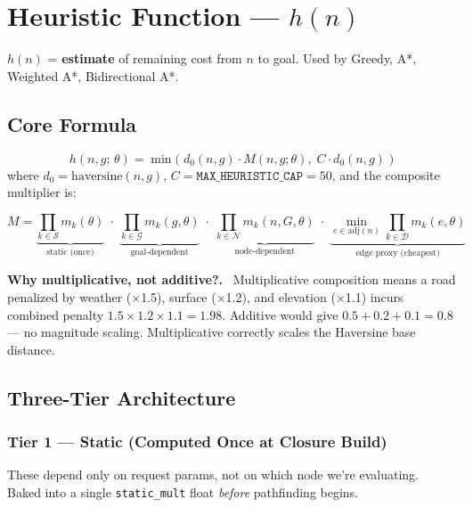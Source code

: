 \documentclass[11pt,a4paper]{article}
\newenvironment{warnbox}[1][Key Point]{%
  \begin{mdframed}[backgroundcolor=warnbox,linecolor=orange!60,linewidth=1pt]%
  \textbf{#1.}\ }{\end{mdframed}}
\begin{document}
\section{Heuristic Function — $h(n)$}

$h(n)$ = \textbf{estimate} of remaining cost from $n$ to goal. Used by Greedy, A*, Weighted A*, Bidirectional A*.

\subsection{Core Formula}
\[
\boxed{
h(n, g;\,\theta) = \min\!\bigl(\;d_0(n,g)\cdot M(n,g;\theta),\; C\cdot d_0(n,g)\;\bigr)
}
\]
where $d_0 = \text{haversine}(n, g)$, $C = \texttt{MAX\_HEURISTIC\_CAP} = 50$, and the composite multiplier is:

\[
M = \underbrace{\prod_{k\in\mathcal{S}} m_k(\theta)}_{\text{static (once)}}
\;\cdot\;
\underbrace{\prod_{k\in\mathcal{G}} m_k(g,\theta)}_{\text{goal-dependent}}
\;\cdot\;
\underbrace{\prod_{k\in\mathcal{N}} m_k(n,G,\theta)}_{\text{node-dependent}}
\;\cdot\;
\underbrace{\min_{e\in\mathrm{adj}(n)}\prod_{k\in\mathcal{D}} m_k(e,\theta)}_{\text{edge proxy (cheapest)}}
\]

\begin{warnbox}[Why multiplicative, not additive?]
Multiplicative composition means a road penalized by weather ($\times$1.5), surface ($\times$1.2), and elevation ($\times$1.1) incurs combined penalty $1.5\times1.2\times1.1 = 1.98$. Additive would give $0.5+0.2+0.1=0.8$ — no magnitude scaling. Multiplicative correctly scales the Haversine base distance.
\end{warnbox}

\subsection{Three-Tier Architecture}

\subsubsection{Tier 1 — Static (Computed Once at Closure Build)}

These depend only on request params, not on which node we're evaluating. Baked into a single
\texttt{static\_mult} float \textit{before} pathfinding begins.
\end{document}
